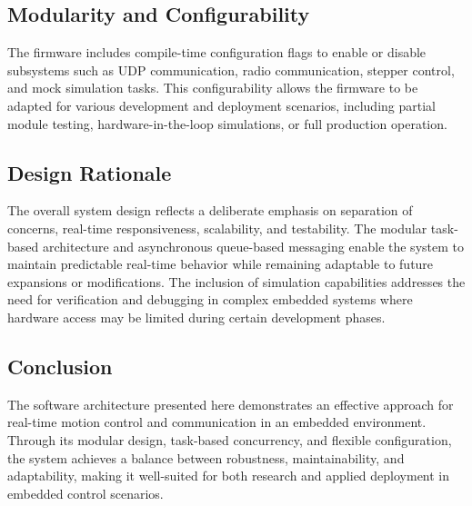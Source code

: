 \subsection{Modularity and Configurability}
The firmware includes compile-time configuration flags to enable or disable subsystems such as UDP communication, radio communication, stepper control, and mock simulation tasks. This configurability allows the firmware to be adapted for various development and deployment scenarios, including partial module testing, hardware-in-the-loop simulations, or full production operation.

\subsection{Design Rationale}
The overall system design reflects a deliberate emphasis on separation of concerns, real-time responsiveness, scalability, and testability. The modular task-based architecture and asynchronous queue-based messaging enable the system to maintain predictable real-time behavior while remaining adaptable to future expansions or modifications. The inclusion of simulation capabilities addresses the need for verification and debugging in complex embedded systems where hardware access may be limited during certain development phases.

\subsection{Conclusion}
The software architecture presented here demonstrates an effective approach for real-time motion control and communication in an embedded environment. Through its modular design, task-based concurrency, and flexible configuration, the system achieves a balance between robustness, maintainability, and adaptability, making it well-suited for both research and applied deployment in embedded control scenarios.